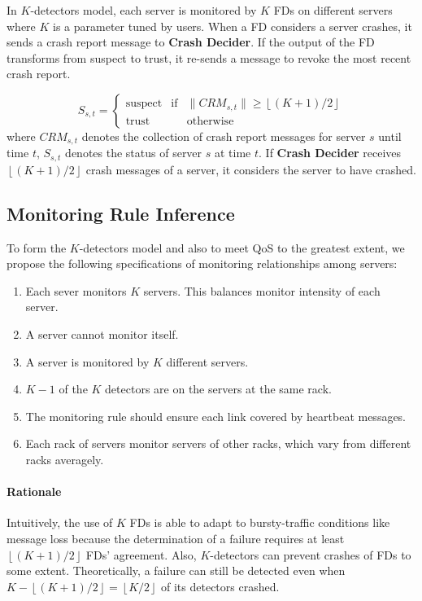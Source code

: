 \documentclass{sig-alternate-05-2015}
\begin{document}
In $K$-detectors model, each server is monitored by $K$ FDs on different servers where $K$ is a parameter tuned by users. When a FD considers a server crashes, it sends a crash report message to \textbf{Crash Decider}. If the output of the FD transforms from suspect to trust, it re-sends a message to revoke the most recent crash report.

\begin{equation}
S_{s,t}=\left\{
    \begin{array}{lcl}
    \text{suspect} & \text{if} & \|CRM_{s,t}\|\geq\left\lfloor(K+1)/2\right\rfloor \\

    \text{trust} && \text{otherwise}
    \end{array}
\right.
\end{equation}
where $CRM_{s,t}$ denotes the collection of crash report messages for server $s$ until time $t$, $S_{s,t}$ denotes the status of server $s$ at time $t$. If \textbf{Crash Decider} receives $\left\lfloor(K+1)/2\right\rfloor$ crash messages of a server, it considers the server to have crashed.

\subsection{Monitoring Rule Inference}
To form the $K$-detectors model and also to meet QoS to the greatest extent, we propose the following specifications of monitoring relationships among servers:
\begin{enumerate}
    \item Each sever monitors $K$ servers. This balances monitor intensity of each server.
    \item A server cannot monitor itself.
    \item A server is monitored by $K$ different servers.
    \item $K-1$ of the $K$ detectors are on the servers at the same rack.
    \item The monitoring rule should ensure each link covered by heartbeat messages.
    \item Each rack of servers monitor servers of other racks, which vary from different racks averagely.
\end{enumerate}

\paragraph{Rationale}
Intuitively, the use of $K$ FDs is able to adapt to bursty-traffic conditions like message loss because the determination of a failure requires at least $\left\lfloor(K+1)/2\right\rfloor$ FDs' agreement. Also, $K$-detectors can prevent crashes of FDs to some extent. Theoretically, a failure can still be detected even when $K-\left\lfloor(K+1)/2\right\rfloor=\left\lfloor K/2\right\rfloor$ of its detectors crashed.
\end{document}
